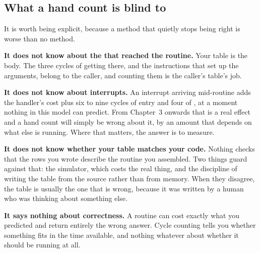 \subsection{What a hand count is blind to}
\label{c1:sec:blind}
It is worth being explicit, because a method that quietly stops being right is worse than no
method.

\textbf{It does not know about the  that reached the routine.} Your table is the body.
The three cycles of getting there, and the instructions that set up the arguments, belong to the
caller, and counting them is the caller's table's job.

\textbf{It does not know about interrupts.} An interrupt arriving mid-routine adds the handler's
cost plus six to nine cycles of entry and four of , at a moment nothing in this model can
predict. From Chapter~3 onwards that is a real effect and a hand count will simply be wrong about
it, by an amount that depends on what else is running. Where that matters, the answer is to
measure.

\textbf{It does not know whether your table matches your code.} Nothing checks that the rows you
wrote describe the routine you assembled. Two things guard against that: the simulator, which
costs the real thing, and the discipline of writing the table from the source rather than from
memory. When they disagree, the table is usually the one that is wrong, because it was written by
a human who was thinking about something else.

\textbf{It says nothing about correctness.} A routine can cost exactly what you predicted and
return entirely the wrong answer. Cycle counting tells you whether something fits in the time
available, and nothing whatever about whether it should be running at all.
